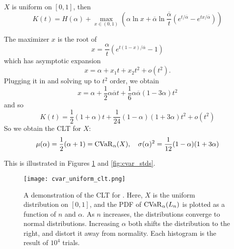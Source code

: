\begin{ex}
$X$ is uniform on $[0, 1]$, then
\begin{equation}
K(t) = H(\alpha) + \max_{x\in(0, 1)}
\left(\alpha \ln x
+
\overbar{\alpha}\ln\frac{\overbar{\alpha}}{t}\left(e^{t/\overbar{\alpha}} - e^{tx/\overbar{\alpha}}\right)\right)
\end{equation}

The maximizer $x$ is the root of 
$$x = \frac{\alpha}{t}\left(e^{t(1-x)/{\overbar\alpha}} - 1\right)$$
which has asymptotic expansion 
$$x = \alpha + x_1 t + x_2 t^2 + o(t^2).$$
Plugging it in and solving up to $t^2$ order, we obtain 
$$ x = \alpha + \frac 12 \alpha{\overbar\alpha} t + \frac 16 \alpha{\overbar\alpha}(1-3\alpha) t^2 $$
and so 
$$K(t) = \frac 12 (1+\alpha) t + \frac{1}{24}(1-\alpha)(1+3\alpha)t^2 + o(t^2)$$
So we obtain the CLT for $X$:
\begin{equation}
\label{eq:uniform_std}
\mu(\alpha) = \frac 12 (\alpha+1) = \operatorname{CVaR}_\alpha(X), \quad \sigma(\alpha)^2 = \frac{1}{12}(1-\alpha)(1+3\alpha)
\end{equation}

This is illustrated in Figures \ref{fig:cvar_uniform_clt} and \ref{fig:cvar_stds}.
\end{ex}

\begin{figure}
	\centering
	\texttt{[image: cvar\_uniform\_clt.png]}
	\caption{A demonstration of the CLT for \cvar. Here, $X$ is the uniform distribution on $[0, 1]$, and the PDF of $\operatorname{CVaR}_\alpha (L_n)$ is plotted as a function of $n$ and $\alpha$. As $n$ increases, the distributions converge to normal distributions. Increasing $\alpha$ both shifts the distribution to the right, and distort it away from normality. Each histogram is the result of $10^4$ trials.}
	\label{fig:cvar_uniform_clt}
\end{figure}

